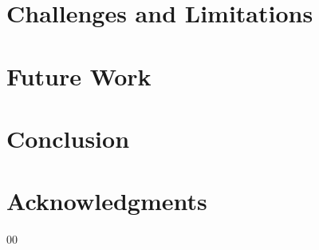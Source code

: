 \documentclass[conference]{IEEEtran}
\begin{document}
\section{Challenges and Limitations}

\section{Future Work}

\section{Conclusion}

\section*{Acknowledgments}

\begin{thebibliography}{00}
\end{thebibliography}
\end{document}
